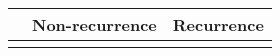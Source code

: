 \begin{tabular}{lcc}
\toprule
{} & Non-recurrence & Recurrence \\
\midrule
{} &                &            \\
\bottomrule
\end{tabular}
